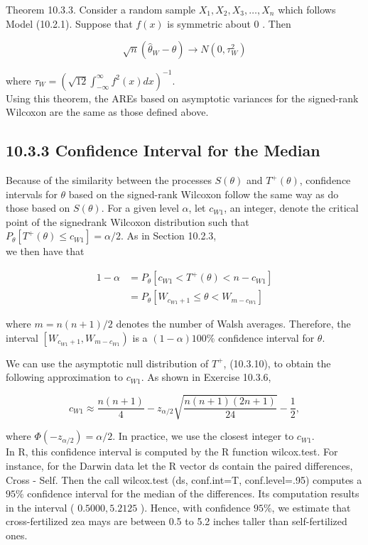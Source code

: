 Theorem 10.3.3. Consider a random sample $X_{1}, X_{2}, X_{3}, \ldots, X_{n}$ which follows Model (10.2.1). Suppose that $f(x)$ is symmetric about 0 . Then


\begin{equation*}
\sqrt{n}\left(\widehat{\theta}_{W}-\theta\right) \rightarrow N\left(0, \tau_{W}^{2}\right) \tag{10.3.32}
\end{equation*}


where $\tau_{W}=\left(\sqrt{12} \int_{-\infty}^{\infty} f^{2}(x) d x\right)^{-1}$.\\
Using this theorem, the AREs based on asymptotic variances for the signed-rank Wilcoxon are the same as those defined above.

\subsection*{10.3.3 Confidence Interval for the Median}
Because of the similarity between the processes $S(\theta)$ and $T^{+}(\theta)$, confidence intervals for $\theta$ based on the signed-rank Wilcoxon follow the same way as do those based on $S(\theta)$. For a given level $\alpha$, let $c_{W 1}$, an integer, denote the critical point of the signedrank Wilcoxon distribution such that $P_{\theta}\left[T^{+}(\theta) \leq c_{W 1}\right]=\alpha / 2$. As in Section 10.2.3,\\
we then have that


\begin{align*}
1-\alpha & =P_{\theta}\left[c_{W 1}<T^{+}(\theta)<n-c_{W 1}\right] \\
& =P_{\theta}\left[W_{c_{W 1}+1} \leq \theta<W_{m-c_{W 1}}\right] \tag{10.3.33}
\end{align*}


where $m=n(n+1) / 2$ denotes the number of Walsh averages. Therefore, the interval $\left[W_{c_{W 1}+1}, W_{m-c_{W 1}}\right)$ is a $(1-\alpha) 100 \%$ confidence interval for $\theta$.

We can use the asymptotic null distribution of $T^{+}$, (10.3.10), to obtain the following approximation to $c_{W 1}$. As shown in Exercise 10.3.6,


\begin{equation*}
c_{W 1} \approx \frac{n(n+1)}{4}-z_{\alpha / 2} \sqrt{\frac{n(n+1)(2 n+1)}{24}}-\frac{1}{2}, \tag{10.3.34}
\end{equation*}


where $\Phi\left(-z_{\alpha / 2}\right)=\alpha / 2$. In practice, we use the closest integer to $c_{W 1}$.\\
In R, this confidence interval is computed by the R function wilcox.test. For instance, for the Darwin data let the R vector ds contain the paired differences, Cross - Self. Then the call wilcox.test (ds, conf.int=T, conf.level=.95) computes a $95 \%$ confidence interval for the median of the differences. Its computation results in the interval ( $0.5000,5.2125$ ). Hence, with confidence $95 \%$, we estimate that cross-fertilized zea mays are between 0.5 to 5.2 inches taller than self-fertilized ones.

